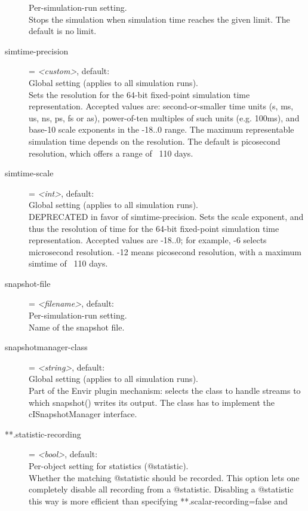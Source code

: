 \begin{description}
    Per-simulation-run setting.\\
    Stops the simulation when simulation time reaches the given limit. The
    default is no limit.
\item[simtime-precision] = \textit{<custom>}, default: \\
    Global setting (applies to all simulation runs).\\
    Sets the resolution for the 64-bit fixed-point simulation time
    representation. Accepted values are: second-or-smaller time units (s, ms,
    us, ns, ps, fs or as), power-of-ten multiples of such units (e.g. 100ms),
    and base-10 scale exponents in the -18..0 range. The maximum representable
    simulation time depends on the resolution. The default is picosecond
    resolution, which offers a range of ~110 days.
\item[simtime-scale] = \textit{<int>}, default: \\
    Global setting (applies to all simulation runs).\\
    DEPRECATED in favor of simtime-precision. Sets the scale exponent, and thus
    the resolution of time for the 64-bit fixed-point simulation time
    representation. Accepted values are -18..0; for example, -6 selects
    microsecond resolution. -12 means picosecond resolution, with a maximum
    simtime of ~110 days.
\item[snapshot-file] = \textit{<filename>}, default: \\
    Per-simulation-run setting.\\
    Name of the snapshot file.
\item[snapshotmanager-class] = \textit{<string>}, default: \\
    Global setting (applies to all simulation runs).\\
    Part of the Envir plugin mechanism: selects the class to handle streams to
    which snapshot() writes its output. The class has to implement the
    cISnapshotManager interface.
\item[**.statistic-recording] = \textit{<bool>}, default: \\
    Per-object setting for statistics (@statistic).\\
    Whether the matching @statistic should be recorded. This option lets one
    completely disable all recording from a @statistic. Disabling a @statistic
    this way is more efficient than specifying **.scalar-recording=false and

\end{description}
